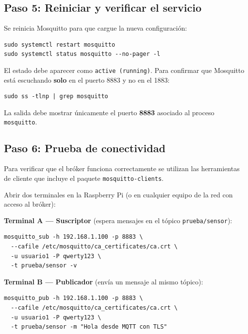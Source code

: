 \documentclass[12pt,a4paper]{article}
\begin{document}
\subsection{Paso 5: Reiniciar y verificar el servicio}

Se reinicia Mosquitto para que cargue la nueva configuración:

\begin{lstlisting}[style=bash]
sudo systemctl restart mosquitto
sudo systemctl status mosquitto --no-pager -l
\end{lstlisting}

El estado debe aparecer como \texttt{active (running)}. Para confirmar que
Mosquitto está escuchando \textbf{solo} en el puerto 8883 y no en el 1883:

\begin{lstlisting}[style=bash]
sudo ss -tlnp | grep mosquitto
\end{lstlisting}

La salida debe mostrar únicamente el puerto \textbf{8883} asociado al proceso
\texttt{mosquitto}.

\subsection{Paso 6: Prueba de conectividad}

Para verificar que el bróker funciona correctamente se utilizan las
herramientas de cliente que incluye el paquete \texttt{mosquitto-clients}.

Abrir dos terminales en la Raspberry Pi (o en cualquier equipo de la red con
acceso al bróker):

\textbf{Terminal A — Suscriptor} (espera mensajes en el tópico
\texttt{prueba/sensor}):

\begin{lstlisting}[style=bash]
mosquitto_sub -h 192.168.1.100 -p 8883 \
  --cafile /etc/mosquitto/ca_certificates/ca.crt \
  -u usuario1 -P qwerty123 \
  -t prueba/sensor -v
\end{lstlisting}

\textbf{Terminal B — Publicador} (envía un mensaje al mismo tópico):

\begin{lstlisting}[style=bash]
mosquitto_pub -h 192.168.1.100 -p 8883 \
  --cafile /etc/mosquitto/ca_certificates/ca.crt \
  -u usuario1 -P qwerty123 \
  -t prueba/sensor -m "Hola desde MQTT con TLS"
\end{lstlisting}
\end{document}
